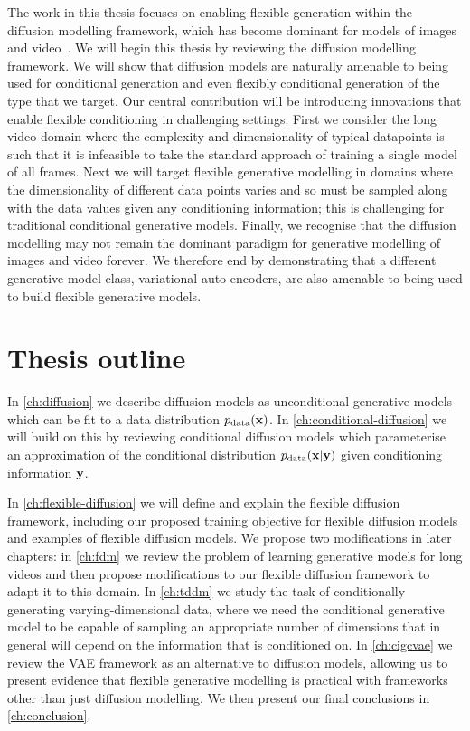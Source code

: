 The work in this thesis focuses on enabling flexible generation within the diffusion modelling framework, which has become dominant for models of images and video~\citep{sohl2015deep,ho2020denoising,dhariwal2021diffusion,rombach2022high,ho2022imagen,peebles2022scalable,brooks2024video}. We will begin this thesis by reviewing the diffusion modelling framework. We will show that diffusion models are naturally amenable to being used for conditional generation and even flexibly conditional generation of the type that we target. Our central contribution will be introducing innovations that enable flexible conditioning in challenging settings. First we consider the long video domain where the complexity and dimensionality of typical datapoints is such that it is infeasible to take the standard approach of training a single model of all frames. Next we will target flexible generative modelling in domains where the dimensionality of different data points varies and so must be sampled along with the data values given any conditioning information; this is challenging for traditional conditional generative models. Finally, we recognise that the diffusion modelling may not remain the dominant paradigm for generative modelling of images and video forever. We therefore end by demonstrating that a different generative model class, variational auto-encoders, are also amenable to being used to build flexible generative models.

\section*{Thesis outline}
In \cref{ch:diffusion} we describe diffusion models as unconditional generative models which can be fit to a data distribution $p_{\rm{data}}({\mathbf{x}})$. In \cref{ch:conditional-diffusion} we will build on this by reviewing conditional diffusion models which parameterise an approximation of the conditional distribution $p_{\rm{data}}({\mathbf{x}}|{\mathbf{y}})$ given conditioning information ${\mathbf{y}}$.

In \cref{ch:flexible-diffusion} we will define and explain the flexible diffusion framework, including our proposed training objective for flexible diffusion models and examples of flexible diffusion models. We propose two modifications in later chapters: in \cref{ch:fdm} we review the problem of learning generative models for long videos and then propose modifications to our flexible diffusion framework to adapt it to this domain. In \cref{ch:tddm} we study the task of conditionally generating varying-dimensional data, where we need the conditional generative model to be capable of sampling an appropriate number of dimensions that in general will depend on the information that is conditioned on. In \cref{ch:cigcvae} we review the VAE framework as an alternative to diffusion models, allowing us to present evidence that flexible generative modelling is practical with frameworks other than just diffusion modelling. We then present our final conclusions in \cref{ch:conclusion}.